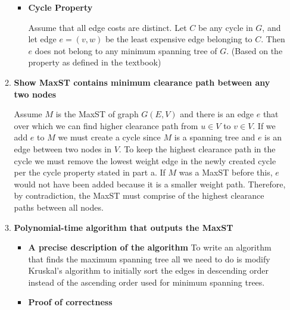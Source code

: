 \documentclass[letterpaper,11pt]{article}
\begin{document}
\begin{enumerate}
\begin{enumerate}
\begin{itemize}
                \item \textbf{Cycle Property}

                    Assume that all edge costs are distinct. Let $C$ be any 
                    cycle in $G$, and let edge $e = (v, w)$ be the least 
                    expensive edge belonging to $C$. Then $e$ does not belong 
                    to any minimum spanning tree of $G$. (Based on the 
                    property as defined in the textbook)


            \end{itemize}
        \item \textbf{Show MaxST contains minimum clearance path between any two 
            nodes}
            
            Assume $M$ is the MaxST of graph $G(E, V)$ and there is an edge $e$ 
            that over which we can find  higher clearance path from $u \in V$ 
            to $v \in V$. If we add $e$ to $M$ we must create a cycle since 
            $M$ is a spanning tree and $e$ is an edge between two nodes in 
            $V$. To keep the highest clearance path in the cycle we must remove 
            the lowest weight edge in the newly created cycle per the cycle 
            property stated in part a. If $M$ was a MaxST before this, $e$ 
            would not have been added because it is a smaller weight path. 
            Therefore, by contradiction, the MaxST must comprise of the highest 
            clearance paths between all nodes. 

        \item \textbf{Polynomial-time algorithm that outputs the MaxST}

            \begin{itemize}
                \item \textbf{A precise description of the algorithm}
                    To write an algorithm that finds the maximum spanning tree
                    all we need to do is modify Kruskal's algorithm to 
                    initially sort the edges in descending order instead of the 
                    ascending order used for minimum spanning trees.

                \item \textbf{Proof of correctness}


\end{itemize}
\end{enumerate}
\end{enumerate}
\end{document}
